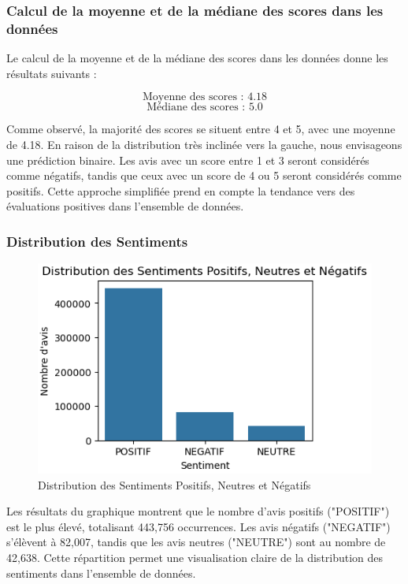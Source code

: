 \subsubsection{Calcul de la moyenne et de la médiane des scores dans les données}


Le calcul de la moyenne et de la médiane des scores dans les données donne les résultats suivants :

\[
\text{Moyenne des scores : } 4.18
\]
\[
\text{Médiane des scores : } 5.0
\]

Comme observé, la majorité des scores se situent entre 4 et 5, avec une moyenne de 4.18. En raison de la distribution très inclinée vers la gauche, nous envisageons une prédiction binaire. Les avis avec un score entre 1 et 3 seront considérés comme négatifs, tandis que ceux avec un score de 4 ou 5 seront considérés comme positifs. Cette approche simplifiée prend en compte la tendance vers des évaluations positives dans l'ensemble de données.


\subsubsection{Distribution des Sentiments}
\begin{figure}[h]
    \centering
    \includegraphics[scale=0.8]{assets/distrubutiondessentiments.PNG}
    \caption{Distribution des Sentiments Positifs, Neutres et Négatifs}
    \label{fig:distrubution_des_sentiments}
\end{figure}

Les résultats du graphique montrent que le nombre d'avis positifs ("POSITIF") est le plus élevé, totalisant 443,756 occurrences. Les avis négatifs ("NEGATIF") s'élèvent à 82,007, tandis que les avis neutres ("NEUTRE") sont au nombre de 42,638. Cette répartition permet une visualisation claire de la distribution des sentiments dans l'ensemble de données.